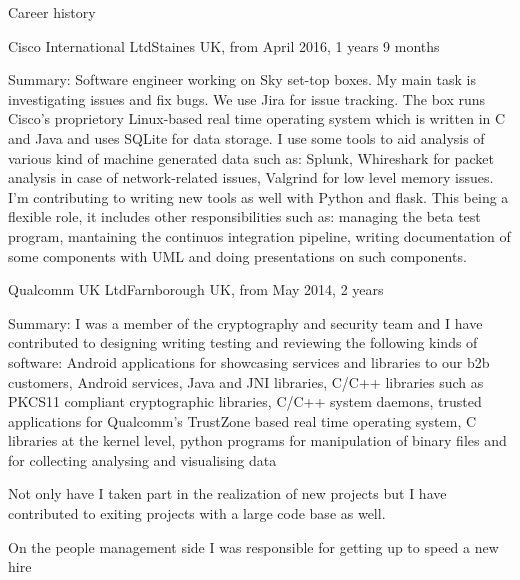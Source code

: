 \documentclass{resume}
\begin{document}
  \begin{rSection}{Career history}
    \begin{rSubsection}{Cisco International Ltd}{Staines UK, from April 2016, 1 years 9 months}{}{}
    \item[Summary:]
      Software engineer working on Sky set-top boxes.
      My main task is investigating issues and fix bugs. 
      We use Jira for issue tracking. 
      The box runs Cisco's proprietory Linux-based real time operating system which is written in C and Java and uses SQLite for data storage.
      I use some tools to aid analysis of various kind of machine generated data such as: Splunk, Whireshark for packet analysis in case of network-related issues, Valgrind for low level memory issues.
      I'm contributing to writing new tools as well with Python and flask.
      This being a flexible role, it includes other responsibilities such as: managing the beta test program, mantaining the continuos integration pipeline, writing documentation of some components with UML and doing presentations on such components.
    \end{rSubsection}

    \begin{rSubsection}{Qualcomm UK Ltd}{Farnborough UK, from May 2014, 2 years}{}{}
	\item[Summary:]
	  I was a member of the cryptography and security team and I have contributed to designing writing testing and reviewing the following kinds of software:
	  Android applications for showcasing services and libraries to our b2b customers,
	  Android services, 
	  Java and JNI libraries, 
	  C/C++ libraries such as PKCS11 compliant cryptographic libraries,
	  C/C++ system daemons,
	  trusted applications for Qualcomm's TrustZone based real time operating system,
	  C libraries at the kernel level,
	  python programs for manipulation of binary files and for collecting analysing and visualising data

	  Not only have I taken part in the realization of new projects but I have contributed to exiting projects with a large code base as well.

	  On the people management side I was responsible for getting up to speed a new hire
	  

\end{rSubsection}
\end{rSection}
\end{document}
